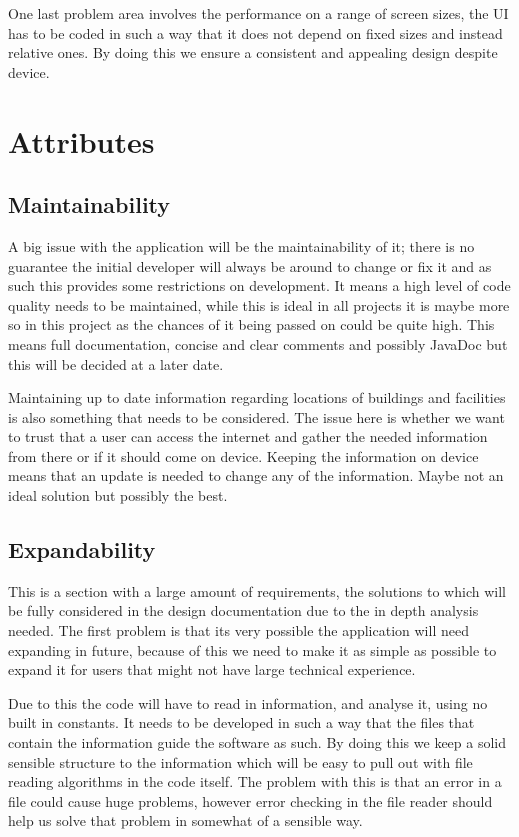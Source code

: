 One last problem area involves the performance on a range of screen sizes, the UI has to be coded in such a way that it does not depend on fixed sizes and instead relative ones. By doing this we ensure a consistent and appealing design despite device. 

\section{Attributes}
\subsection{Maintainability}
A big issue with the application will be the maintainability of it; there is no guarantee the initial developer will always be around to change or fix it and as such this provides some restrictions on development. It means a high level of code quality needs to be maintained, while this is ideal in all projects it is maybe more so in this project as the chances of it being passed on could be quite high. This means full documentation, concise and clear comments and possibly JavaDoc but this will be decided at a later date. 

Maintaining up to date information regarding locations of buildings and facilities is also something that needs to be considered. The issue here is whether we want to trust that a user can access the internet and gather the needed information from there or if it should come on device. Keeping the information on device means that an update is needed to change any of the information. Maybe not an ideal solution but possibly the best. 
\subsection{Expandability}
This is a section with a large amount of requirements, the solutions to which will be fully considered in the design documentation due to the in depth analysis needed. The first problem is that its very possible the application will need expanding in future, because of this we need to make it as simple as possible to expand it for users that might not have large technical experience. 

Due to this the code will have to read in information, and analyse it, using no built in constants. It needs to be developed in such a way that the files that contain the information guide the software as such. By doing this we keep a solid sensible structure to the information which will be easy to pull out with file reading algorithms in the code itself. The problem with this is that an error in a file could cause huge problems, however error checking in the file reader should help us solve that problem in somewhat of a sensible way. 
